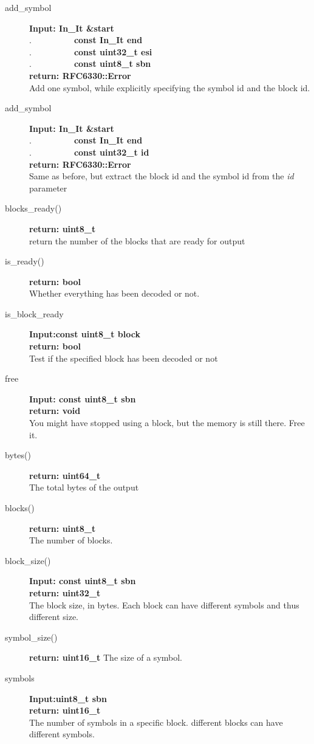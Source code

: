 \documentclass[11pt,a4paper]{refart}
\begin{document}
\begin{description}
\item[add\_symbol]\textbf{Input: In\_It \&start}\\
.\ \ \ \ \ \ \ \ \ \ \textbf{const In\_It end}\\
.\ \ \ \ \ \ \ \ \ \ \textbf{const uint32\_t esi}\\
.\ \ \ \ \ \ \ \ \ \ \textbf{const uint8\_t sbn}\\
\textbf{return: RFC6330::Error}\\
Add one symbol, while explicitly specifying the symbol id and the block id.

\item[add\_symbol]\textbf{Input: In\_It \&start}\\
.\ \ \ \ \ \ \ \ \ \ \textbf{const In\_It end}\\
.\ \ \ \ \ \ \ \ \ \ \textbf{const uint32\_t id}\\
\textbf{return: RFC6330::Error}\\
Same as before, but extract the block id and the symbol id from the \textit{id} parameter

\item[blocks\_ready()]\textbf{return: uint8\_t}\\
return the number of the blocks that are ready for output
\item[is\_ready()]\textbf{return: bool}\\
Whether everything has been decoded or not.
\item[is\_block\_ready]\textbf{Input:const uint8\_t block}\\
\textbf{return: bool}\\
Test if the specified block has been decoded or not


\item[free]\textbf{Input: const uint8\_t sbn}\\
\textbf{return: void}\\
You might have stopped using a block, but the memory is still there. Free it.

\item[bytes()] \textbf{return: uint64\_t}\\
The total bytes of the output
\item[blocks()] \textbf{return: uint8\_t}\\
The number of blocks.

\item[block\_size()] \textbf{Input: const uint8\_t sbn}\\
\textbf{return: uint32\_t}\\
The block size, in bytes. Each block can have different symbols and thus different size.

\item[symbol\_size()] \textbf{return: uint16\_t} The size of a symbol.

\item[symbols] \textbf{Input:uint8\_t sbn}\\
\textbf{return: uint16\_t}\\
The number of symbols in a specific block. different blocks can have different symbols.
\end{description}
\newpage
\end{document}
